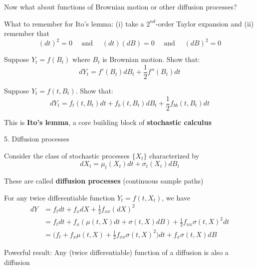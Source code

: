 \documentclass[11pt, aspectratio=169]{beamer}
\newenvironment{witemize}{\itemize\addtolength{\itemsep}{10pt}}{\enditemize}
\begin{document}
\begin{frame}{}

\begin{witemize}
\item Now what about functions of Brownian motion or other diffusion processes? 

\item What to remember for Ito's lemma: (i) take a $2^{nd}$-order Taylor expansion and (ii) remember that 
\begin{equation*}
	(dt)^2 = 0
	\quad \text{ and } \quad
	(dt)(dB) = 0
	\quad \text{ and } \quad
	(dB)^2 = 0
\end{equation*}

\item Suppose $Y_t = f(B_t)$ where $B_t$ is Brownian motion. Show that:
\begin{equation*}
	dY_t = f'(B_t) dB_t + \frac{1}{2} f''(B_t) dt 
\end{equation*}

\item Suppose $Y_t = f(t, B_t)$. Show that:
\begin{equation*}
	dY_t = f_t(t, B_t) dt + f_b(t, B_t) dB_t + \frac{1}{2} f_{bb}(t, B_t) dt 
\end{equation*}

\item This is \textbf{Ito's lemma}, a core building block of \textbf{stochastic calculus}

\end{witemize}
\end{frame}


\begin{frame}{5. Diffusion processes}
\begin{witemize}
\item Consider the class of stochastic processes $\{X_t\}$ characterized by 
\begin{equation*}
	dX_t = \mu_t(X_t) dt + \sigma_t(X_t) dB_t
\end{equation*}

\item These are called \textbf{diffusion processes} (continuous sample paths)

\item For any twice differentiable function $Y_t = f(t, X_t)$, we have
	\begin{align*}
		dY &= f_t dt + f_x dX + \frac{1}{2} f_{xx} (dX)^2 \\
		&= f_t dt + f_x (\mu(t, X) dt + \sigma(t, X) dB) + \frac{1}{2} f_{xx} \sigma(t, X)^2 dt \\
		&= \Big( f_t + f_x \mu(t, X) + \frac{1}{2} f_{xx} \sigma(t, X)^2 \Big) dt + f_x \sigma(t, X) dB
	\end{align*}

\item Powerful result: Any (twice differentiable) function of a diffusion is also a diffusion
\end{witemize}
\end{frame}
\end{document}
